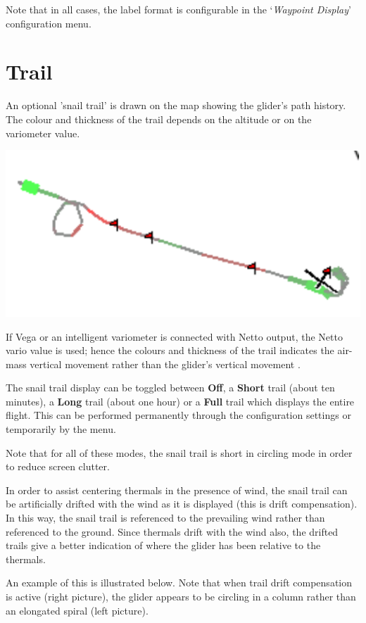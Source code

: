 Note that in all cases, the label format is configurable in the 
`{\it Waypoint Display}' configuration menu.  


\section{Trail}\label{sec:trail}

An optional 'snail trail' is drawn on the map showing the glider's
path history.  The colour and thickness of the trail depends on the altitude or
on the variometer value. 

\begin{center}
\includegraphics[angle=0,width=0.5\linewidth,keepaspectratio='true']{figures/snail.pdf}
\end{center}

If Vega or an intelligent variometer is connected with Netto output,
the Netto vario value is used; hence the colours and thickness of the
trail indicates the air-mass vertical movement rather than the glider's
vertical movement	.

The snail trail display can be toggled between {\bf Off}, a {\bf Short} trail
(about ten minutes), a {\bf Long} trail (about one hour) or a {\bf Full} trail
which displays the entire flight.  This can be performed permanently
through the configuration settings or temporarily by the
menu.

Note that for all of these modes, the snail trail is short in
circling mode in order to reduce screen clutter.

In order to assist centering thermals in the presence of wind, the
snail trail can be artificially drifted with the wind as it is
displayed (this is drift compensation).  In this way, the snail trail
is referenced to the prevailing wind rather than referenced to the
ground.  Since thermals drift with the wind also, the drifted trails
give a better indication of where the glider has been relative to the
thermals.

An example of this is illustrated below.  Note that when trail drift
compensation is active (right picture), the glider appears to be
circling in a column rather than an elongated spiral (left picture).

